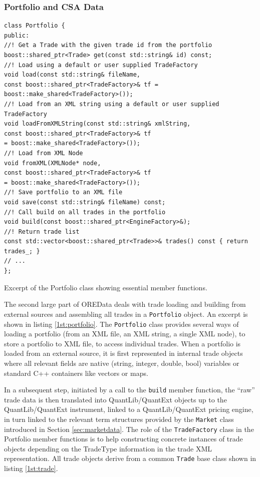 \documentclass[12pt, a4paper]{report}
\begin{document}
\subsubsection{Portfolio and CSA Data}

\begin{listing}[H]
\begin{verbatim}
class Portfolio {
public:
//! Get a Trade with the given trade id from the portfolio
boost::shared_ptr<Trade> get(const std::string& id) const;
//! Load using a default or user supplied TradeFactory
void load(const std::string& fileName,
const boost::shared_ptr<TradeFactory>& tf = boost::make_shared<TradeFactory>());
//! Load from an XML string using a default or user supplied TradeFactory
void loadFromXMLString(const std::string& xmlString,
const boost::shared_ptr<TradeFactory>& tf
= boost::make_shared<TradeFactory>());
//! Load from XML Node
void fromXML(XMLNode* node,
const boost::shared_ptr<TradeFactory>& tf
= boost::make_shared<TradeFactory>());
//! Save portfolio to an XML file
void save(const std::string& fileName) const;
//! Call build on all trades in the portfolio
void build(const boost::shared_ptr<EngineFactory>&);
//! Return trade list
const std::vector<boost::shared_ptr<Trade>>& trades() const { return trades_; }
// ...
};
\end{verbatim}
\caption{Excerpt of the Portfolio class showing essential member functions.}
\label{1st:portfolio}
\end{listing}

The second large part of OREData deals with trade loading and building from external sources and assembling all trades in a {\tt Portfolio} object. An excerpt is shown in listing \ref{1st:portfolio}. The {\tt Portfolio} class provides several ways of loading a portfolio (from an
XML file, an XML string, a single XML node), to store a portfolio to XML file, to access individual trades. When a portfolio is loaded from an external source, it is first represented in internal trade objects where all relevant fields are native (string, integer, double, bool) variables
or standard C++ containers like vectors or maps.

In a subsequent step, initiated by a call to the {\tt build} member function, the ``raw'' trade data is then translated into QuantLib/QuantExt objects up to the QuantLib/QuantExt instrument, linked to a QuantLib/QuantExt pricing engine, in turn linked to the relevant term structures provided by the {\tt Market} class introduced in Section \ref{sec:marketdata}.
The role of the {\tt TradeFactory} class in the Portfolio member functions is to help constructing concrete instances of trade objects depending on the TradeType information in the trade XML representation.
All trade objects derive from a common {\tt Trade} base class shown in listing \ref{1st:trade}.
\end{document}
